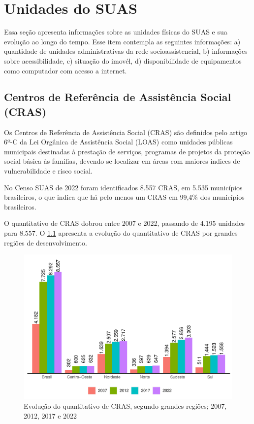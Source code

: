 \documentclass[
  brazilian]{report}
\begin{document}
\hypertarget{unidades-do-suas}{%
\chapter{Unidades do SUAS}\label{unidades-do-suas}}

Essa seção apresenta informações sobre as unidades físicas do SUAS e sua
evolução ao longo do tempo. Esse item contempla as seguintes
informações: a) quantidade de unidades administrativas da rede
socioassistencial, b) informações sobre acessibilidade, c) situação do
imovél, d) disponibilidade de equipamentos como computador com acesso a
internet.

\hypertarget{centros-de-referuxeancia-de-assistuxeancia-social-cras}{%
\section{Centros de Referência de Assistência Social
(CRAS)}\label{centros-de-referuxeancia-de-assistuxeancia-social-cras}}

Os Centros de Referência de Assistência Social (CRAS) são definidos pelo
artigo 6º-C da Lei Orgânica de Assistência Social (LOAS) como unidades
públicas municipais destinadas à prestação de serviços, programas de
projetos da proteção social básica às famílias, devendo se localizar em
áreas com maiores índices de vulnerabilidade e risco social.

No Censo SUAS de 2022 foram identificados 8.557 CRAS, em 5.535
municípios brasileiros, o que indica que há pelo menos um CRAS em 99,4\%
dos municípios brasileiros.

O quantitativo de CRAS dobrou entre 2007 e 2022, passando de 4.195
unidades para 8.557. O \cref{fig:quantitativo-CRAS} apresenta a evolução
do quantitativo de CRAS por grandes regiões de desenvolvimento.

\begin{figure}
\includegraphics{Censo-SUAS-2022_files/figure-latex/quantitativo-CRAS-1} \caption[Evolução do quantitativo de CRAS, segundo grandes regiões]{Evolução do quantitativo de CRAS, segundo grandes regiões; 2007, 2012, 2017 e 2022}\label{fig:quantitativo-CRAS}
\end{figure}
\end{document}
